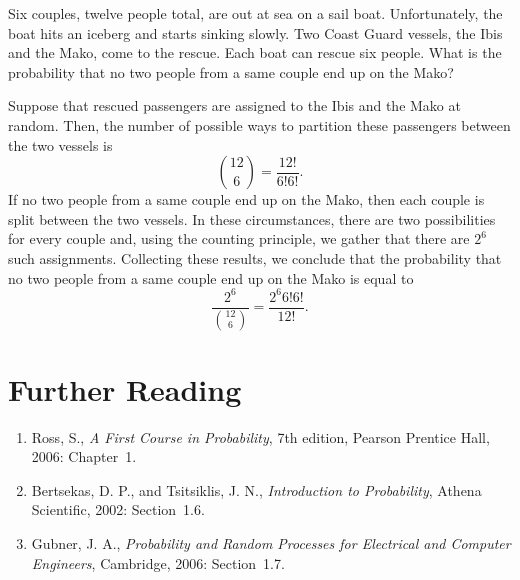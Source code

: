 \begin{example}
Six couples, twelve people total, are out at sea on a sail boat.
Unfortunately, the boat hits an iceberg and starts sinking slowly.
Two Coast Guard vessels, the Ibis and the Mako, come to the rescue.
Each boat can rescue six people.
What is the probability that no two people from a same couple end up on the Mako?

Suppose that rescued passengers are assigned to the Ibis and the Mako  at random.
Then, the number of possible ways to partition these passengers between the two vessels is
\begin{equation*}
\binom{12}{6} = \frac{12!}{6! 6!} .
\end{equation*}
If no two people from a same couple end up on the Mako, then each couple is split between the two vessels.
In these circumstances, there are two possibilities for every couple and, using the counting principle, we gather that there are $2^6$ such assignments.
Collecting these results, we conclude that the probability that no two people from a same couple end up on the Mako is equal to
\begin{equation*}
\frac{2^6}{\binom{12}{6}} = \frac{2^6 6! 6!}{12!} .
\end{equation*}
\end{example}


\section*{Further Reading}

\begin{small}
\begin{enumerate}
\item Ross, S., \emph{A First Course in Probability}, 7th edition, Pearson Prentice Hall, 2006: Chapter~1.
\item Bertsekas, D. P., and Tsitsiklis, J. N., \emph{Introduction to Probability}, Athena Scientific, 2002: Section~1.6.
\item Gubner, J. A., \emph{Probability and Random Processes for Electrical and Computer Engineers}, Cambridge, 2006: Section~1.7.
\end{enumerate}
\end{small}

